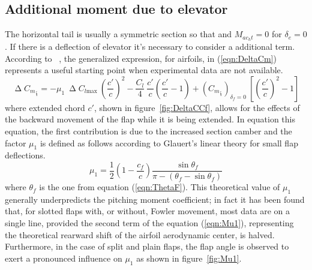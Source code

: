 \subsection{Additional moment due to elevator}
The horizontal tail is usually a symmetric section so that and $M_{ac_ht} = 0$ for $\delta_e = 0$. If there is a deflection of elevator it's necessary to consider a additional term. According to ~\cite{torenbeek1982synthesis}, the generalized expression, for airfoils, in (\ref{eqn:DeltaCm}) represents a useful starting point when experimental data are not available.
%
\begin{equation}
\upDelta C_{m_{\frac{c}{4}}}=-\mu_1\ \upDelta C_{l\text{max}}\ \left(\dfrac{c'}{c}\right)^2-\dfrac{C_l}{4}\ \dfrac{c'}{c}\left(\dfrac{c'}{c}-1\right)+\left(C_{m_{\frac{c}{4}}}\right)_{\delta_f=0}\ \left[\left(\dfrac{c'}{c}\right)^2-1\right]
\label{eqn:DeltaCm}
\end{equation}
%
where extended chord $c'$, shown in figure~\ref{fig:DeltaCCf}, allows for the effects of the backward movement of the flap while it is being extended.
%
In equation this equation, the first contribution is due to the increased section camber and the factor $\mu_1$ is defined as follows according to Glauert's linear theory for small flap deflections.
%
\begin{equation}
\mu_1=\dfrac{1}{2}\left(1-\dfrac{c_f}{c}\right)\dfrac{\sin\theta_f}{\pi-\left(\theta_f-\sin\theta_f\right)}
\label{eqn:Mu1}
\end{equation}
%
where $\theta_f$ is the one from equation (\ref{eqn:ThetaF}). This theoretical value of $\mu_1$ generally underpredicts the pitching moment coefficient; in fact it has been found that, for slotted flaps with, or without, Fowler movement, most data are on a single line, provided the second term of the equation (\ref{eqn:Mu1}), representing the theoretical rearward shift of the airfoil aerodynamic center, is halved. Furthermore, in the case of split and plain flaps, the flap angle is observed to exert a pronounced influence on $\mu_1$ as shown in figure~\ref{fig:Mu1}.
%

